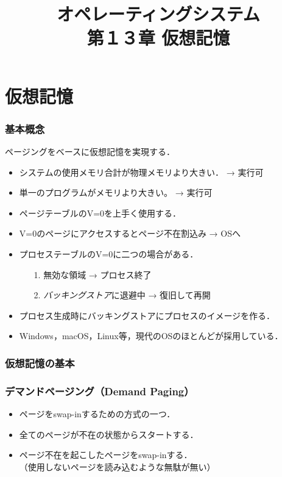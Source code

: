 \documentclass{beamer}                   %
\begin{document}
\title[主記憶]{オペレーティングシステム\\第１３章 仮想記憶}
\date{}

\begin{frame}
  \titlepage
\end{frame}


\section{仮想記憶}
\begin{frame}
  \frametitle{基本概念}
  ページングをベースに仮想記憶を実現する．
  \begin{itemize}
  \item システムの使用メモリ合計が物理メモリより大きい． → 実行可
  \item 単一のプログラムがメモリより大きい。 → 実行可
  \item ページテーブルのV=0を上手く使用する．
  \item V=0のページにアクセスするとページ不在割込み → OSへ
  \item プロセステーブルのV=0に二つの場合がある．
    \begin{itemize}
      \item[1.] 無効な領域 → プロセス終了
      \item[2.] \emph{バッキングストア}に退避中 → 復旧して再開
    \end{itemize}
  \item プロセス生成時にバッキングストアにプロセスのイメージを作る．
  \item Windows，macOS，Linux等，現代のOSのほとんどが採用している．
  \end{itemize}
\end{frame}

\begin{frame}
  \frametitle{仮想記憶の基本}
\end{frame}

\begin{frame}
  \frametitle{デマンドページング（Demand Paging）}
  \begin{itemize}
  \item ページをswap-inするための方式の一つ．
  \item 全てのページが不在の状態からスタートする．
  \item ページ不在を起こしたページをswap-inする．\\
    （使用しないページを読み込むような無駄が無い）
  \end{itemize}
\end{frame}
\end{document}

